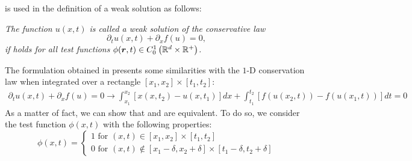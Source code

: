%
 is used in the definition of a weak solution as follows:
%
\begin{definition}
\emph{The function $u(x,t)$ is called a weak solution of the conservative law
%
\begin{equation}
\partial_t u(x,t) + \partial_x f(u) = 0, \nonumber
\end{equation}
%
if  holds for all test functions $\phi(\boldsymbol r, t) \in C_0^1 \left( \mathbb{R}^d \times \mathbb{R}^+ \right)$.}
\end{definition}
%
The formulation obtained in  presents some similarities with the $1$-D conservation law when integrated over a rectangle $\left[ x_1,x_2 \right] \times \left[ t_1,t_2 \right]$:
%
\begin{align}\label{eq:weak_sol4_sct1b}
\partial_t u(x,t) + \partial_x f(u) = 0 \to
\int_{x_1}^{x_2} \left[ x(x,t_2) - u(x,t_1) \right] dx + \int_{t_1}^{t_2} \left[ f(u(x_2,t)) - f(u(x_1,t)) \right]dt = 0
\end{align}
%
As a matter of fact, we can show that  and  are equivalent. To do so, we consider the test function $\phi(x,t)$ with the following properties:
%
\begin{equation}\label{eq:weak_sol5_sct1b}
\phi(x,t) = \left\{
\begin{array}{l}
1  \text{ for }  (x,t) \in \left[ x_1,x_2 \right] \times \left[ t_1,t_2 \right]  \\
0 \text{ for } (x,t) \notin \left[ x_1-\delta,x_2+\delta \right] \times \left[ t_1-\delta,t_2+\delta \right]
\end{array}\right.
\end{equation}
%
